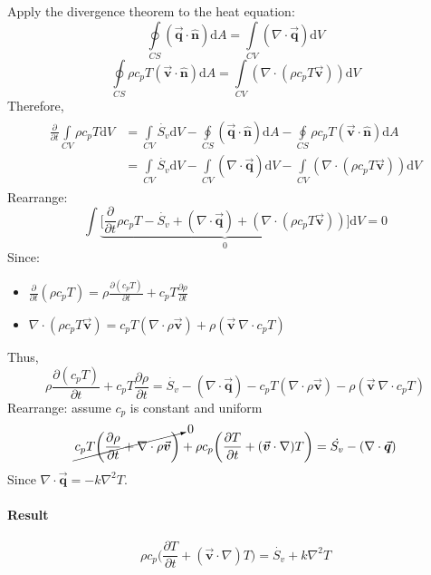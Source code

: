 \documentclass[12pt, a4paper]{article}
\numberwithin{equation}{subsection}
\begin{document}
\begin{tcolorbox}[breakable, title = \textbf{Derivation}]
Apply the divergence theorem to the heat equation:
\[ 
    \oint\limits_{CS} (\vec{\bm{q}} \cdot \bm{\hat{n}}) \mathrm{d}A = \int\limits_{CV} (\nabla \cdot \vec{\bm{q}}) \mathrm{d}V
\]
\[ 
    \oint\limits_{CS} \rho c_{p} T (\vec{\bm{v}} \cdot \bm{\hat{n}}) \mathrm{d}A =  \int\limits_{CV} (\nabla \cdot (\rho c_{p} T \vec{\bm{v}})) \mathrm{d}V 
\]
Therefore,
\begin{align*}
\begin{split}
    \frac{\partial}{\partial t} \int\limits_{CV} \rho c_{p} T \mathrm{d}V 
    &= \int\limits_{CV} \dot{S_{v}} \mathrm{d}V - \oint\limits_{CS} (\vec{\bm{q}} \cdot \bm{\hat{n}}) \mathrm{d}A - \oint\limits_{CS} \rho c_{p} T (\vec{\bm{v}} \cdot \bm{\hat{n}}) \mathrm{d}A \\
    &= \int\limits_{CV} \dot{S_{v}} \mathrm{d}V - \int\limits_{CV} (\nabla \cdot \vec{\bm{q}}) \mathrm{d}V - \int\limits_{CV} (\nabla \cdot (\rho c_{p} T \vec{\bm{v}})) \mathrm{d}V 
\end{split}
\end{align*}
Rearrange:
\[ 
    \int \underbrace{\bigg[ \frac{\partial}{\partial t}\rho c_{p} T - \dot{S_{v}} + (\nabla \cdot \vec{\bm{q}}) + (\nabla \cdot (\rho c_{p} T \vec{\bm{v}})) \bigg]}_{0} \mathrm{d}V = 0 
\]
Since:
\begin{itemize}
    \item $\frac{\partial}{\partial t}(\rho c_{p} T) = \rho \frac{\partial (c_{p} T)}{\partial t} +  c_{p} T \frac{\partial  \rho}{\partial t}$
    \item $\nabla \cdot (\rho c_{p} T \vec{\bm{v}} ) = c_{p} T(\nabla \cdot \rho \vec{\bm{v}}) + \rho(\vec{\bm{v}} \ \nabla \cdot c_{p} T) $ 
\end{itemize}
Thus,
\[ 
    \rho \frac{\partial (c_{p} T)}{\partial t} +  c_{p} T \frac{\partial  \rho}{\partial t} = \dot{S_{v}} -(\nabla \cdot \vec{\bm{q}}) - c_{p} T(\nabla \cdot \rho \vec{\bm{v}}) - \rho(\vec{\bm{v}} \ \nabla \cdot c_{p} T) 
\]
Rearrange: assume $c_{p}$ is constant and uniform
\[ 
    \cancelto{0}{c_{p}T \bigg( \frac{\partial  \rho}{\partial t} + \nabla \cdot \rho \vec{\bm{v}} \bigg)} + \rho c_{p} \bigg(\frac{\partial T}{\partial t} +(\vec{\bm{v}} \cdot \nabla) T \bigg) = \dot{S_{v}} - (\nabla \cdot \vec{\bm{q}}) 
\]
Since $\nabla \cdot \vec{\bm{q}} = -k \nabla^{2} T$.
\paragraph{Result}
\[ 
    \rho c_{p}\bigg( \frac{\partial T}{\partial t} + (\vec{\bm{v}} \cdot \nabla) T \bigg) = \dot{S_{v}}  +k \nabla^{2} T 
\]
\end{tcolorbox}
\end{document}

